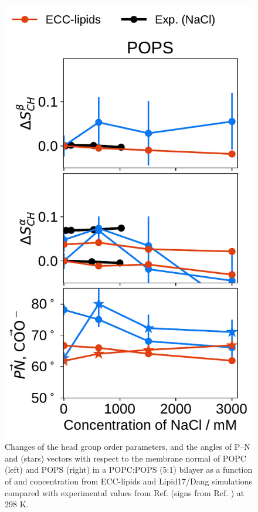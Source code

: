 \documentclass[journal=jpcbfk,manuscript=article]{achemso}
\newlength{\figheightsmall}
\newlength{\figheight}
\begin{document}
\begin{figure}[tbp!]
  \includegraphics[height=\figheightsmall]{../img/ecc_pops/order_parameters_changes_ecc-lip_L14_A-B-PN-COO_POPS_nacl.pdf} 
  \caption{\label{fig:delta_ordPar_monoval_PCPS}
    Changes of the head group order parameters, and the angles of P--N and  (stars) vectors 
    with respect to the membrane normal of POPC (left) and POPS (right) in a POPC:POPS (5:1) bilayer 
    as a function of  and  concentration from ECC-lipids and Lipid17/Dang simulations 
    compared with experimental values from Ref.  (signs from Ref. ) at 298 K.
}
\end{figure}
\end{document}
